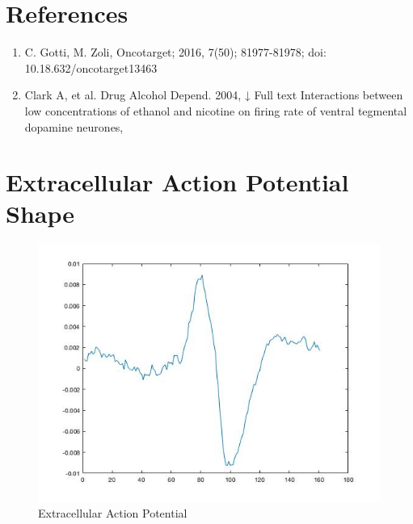\documentclass{article}
\begin{document}

\newpage
\section{References}
\begin{enumerate}
	\item  C. Gotti, M. Zoli, Oncotarget; 2016, 7(50); 81977-81978; doi: 10.18.632/oncotarget13463
	\item Clark A, et al. Drug Alcohol Depend. 2004, ↓ Full text
Interactions between low concentrations of ethanol and nicotine on firing rate of ventral tegmental dopamine neurones,
\end{enumerate}

\vspace*{4\baselineskip}

\section{Extracellular Action Potential Shape}
\begin{figure}[h]
	\centering
  \includegraphics[width=\linewidth]{Action_Potential.jpg}
  \caption{Extracellular Action Potential}
  \label{fig:room_temp_raw}
\end{figure}
\end{document}
